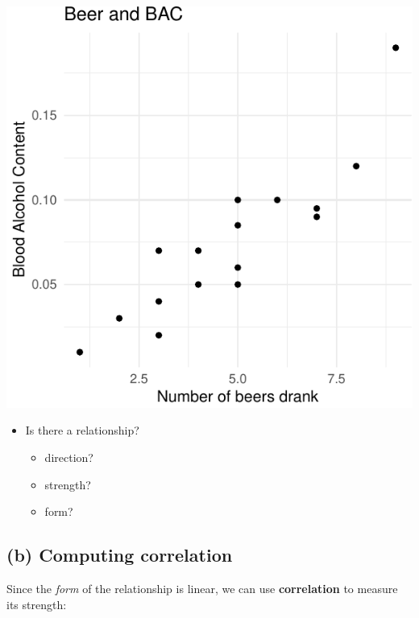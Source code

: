 \documentclass[
]{book}
\newenvironment{Shaded}{\begin{snugshade}}{\end{snugshade}}
\newcommand{\FunctionTok}[1]{\textcolor[rgb]{0.00,0.00,0.00}{#1}}
\newcommand{\NormalTok}[1]{#1}
\newcommand{\SpecialCharTok}[1]{\textcolor[rgb]{0.00,0.00,0.00}{#1}}
\providecommand{\tightlist}{%
  \setlength{\itemsep}{0pt}\setlength{\parskip}{0pt}}
\begin{document}
\includegraphics[width=1\linewidth]{Class_Activity_6_files/figure-latex/unnamed-chunk-3-1}

\begin{itemize}
\tightlist
\item
  Is there a relationship?

  \begin{itemize}
  \tightlist
  \item
    direction?
  \item
    strength?
  \item
    form?
  \end{itemize}
\end{itemize}

\hypertarget{b-computing-correlation}{%
\subsection{(b) Computing correlation}\label{b-computing-correlation}}

Since the \emph{form} of the relationship is linear, we can use \textbf{correlation} to measure its strength:

\begin{Shaded}
\end{Shaded}
\end{document}
